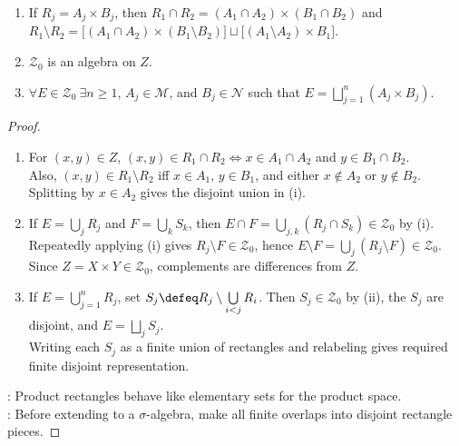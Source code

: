 \begin{lemma} \label{lem:finite-rectangle-algebra-product-measure} 
\begin{enumerate}[label=(\roman*)]
\setlength{\itemsep}{0pt}
\item If $R_j=A_j\times B_j$, then $R_1\cap R_2=(A_1\cap A_2)\times(B_1\cap B_2)$ and $R_1\setminus R_2=\bigl[(A_1\cap A_2)\times(B_1\setminus B_2)\bigr]\sqcup\bigl[(A_1\setminus A_2)\times B_1\bigr]$.
\item $\mathcal{Z}_0$ is an algebra on $Z$.
\item $\forall E\in\mathcal{Z}_0\ \exists n\geq1$, $A_j\in\mathcal{M}$, and $B_j\in\mathcal{N}$ such that $E=\bigsqcup\limits_{j=1}^n(A_j\times B_j)$.
\end{enumerate}
\begin{proof}
\begin{enumerate}[label=(\roman*)]
\setlength{\itemsep}{0pt}
\item For $(x,y)\in Z$, $(x,y)\in R_1\cap R_2\Longleftrightarrow x\in A_1\cap A_2$ and $y\in B_1\cap B_2$.\\
Also, $(x,y)\in R_1\setminus R_2$ iff $x\in A_1$, $y\in B_1$, and either $x\notin A_2$ or $y\notin B_2$.\\
Splitting by $x\in A_2$ gives the disjoint union in (i).
\item If $E=\bigcup\limits_jR_j$ and $F=\bigcup\limits_kS_k$, then $E\cap F=\bigcup\limits_{j,k}(R_j\cap S_k)\in\mathcal{Z}_0$ by (i).\\
Repeatedly applying (i) gives $R_j\setminus F\in\mathcal{Z}_0$, hence $E\setminus F=\bigcup\limits_j(R_j\setminus F)\in\mathcal{Z}_0$.\\
Since $Z=X\times Y\in\mathcal{Z}_0$, complements are differences from $Z$.
\item If $E=\bigcup\limits_{j=1}^nR_j$, set $S_j\defeq R_j\setminus\bigcup\limits_{i<j}R_i$. Then $S_j\in\mathcal{Z}_0$ by (ii), the $S_j$ are disjoint, and $E=\bigsqcup\limits_jS_j$.\\
Writing each $S_j$ as a finite union of rectangles and relabeling gives required finite disjoint representation.
\end{enumerate}
: Product rectangles behave like elementary sets for the product space.\\
: Before extending to a $\sigma$-algebra, make all finite overlaps into disjoint rectangle pieces.
\end{proof}
\end{lemma}

